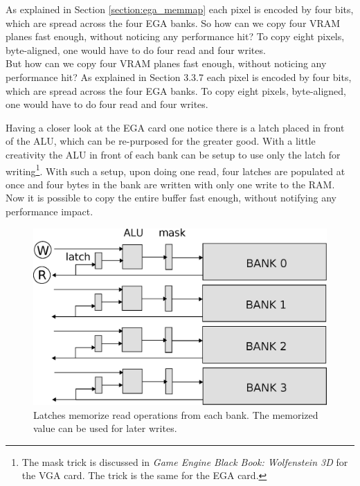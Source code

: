 \documentclass[book.tex]{subfiles}
\begin{document}
\par
\begin{minipage}{\textwidth}
  
  \end{minipage}
  \label{ega_refresh}
  \par
As explained in Section \ref{section:ega_memmap} each pixel is encoded by four bits, which are spread across the four EGA banks. So how can we copy four VRAM planes fast enough, without noticing any performance hit? To copy eight pixels, byte-aligned, one would have to do four read and four writes.\\



But how can we copy four VRAM planes fast enough, without noticing any performance hit? As explained in Section 3.3.7 each pixel is encoded by four bits, which are spread across the four EGA banks. To copy eight pixels, byte-aligned, one would have to do four read and four writes.\\

\par
Having a closer look at the EGA card one notice there is a latch placed in front of the ALU, which can be re-purposed for the greater good. With a little creativity the ALU in front of each bank can be setup to use only the latch for writing\footnote{The mask trick is discussed in \textit{Game Engine Black Book: Wolfenstein 3D} for the VGA card. The trick is the same for the EGA card.}. With such a setup, upon doing one read, four latches are populated at once and four bytes in the bank are written with only one write to the RAM. Now it is possible to copy the entire buffer fast enough, without notifying any performance impact.\\ 

\par
 \begin{figure}[H]
\centering
 \includegraphics[width=\textwidth]{imgs/drawings/latches.eps}
 \caption{Latches memorize read operations from each bank. The memorized value can be used for later writes.}
 \end{figure}
 
\end{document}
